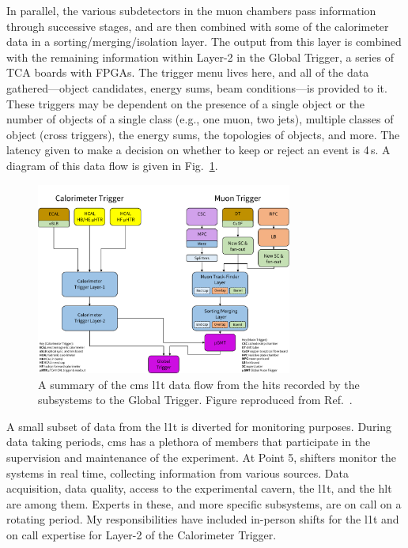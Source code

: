 In parallel, the various subdetectors in the muon chambers pass information through successive stages, and are then combined with some of the calorimeter data in a sorting/merging/isolation layer. The output from this layer is combined with the remaining information within Layer-2 in the Global Trigger, a series of \si{\micro}TCA boards with FPGAs. The trigger menu lives here, and all of the data gathered---object candidates, energy sums, beam conditions---is provided to it. These triggers may be dependent on the presence of a single object or the number of objects of a single class (e.g., one muon, two \glspl{jet}), multiple classes of object (cross triggers), the energy sums, the topologies of objects, and more. The latency given to make a decision on whether to keep or reject an event is 4\,\si{\micro}s. A diagram of this data flow is given in Fig.~\ref{fig:cms_l1t_data_flow}.

\begin{figure}[htbp]
    \centering
    \includegraphics[width=0.75\textwidth]{figures/CMS_L1T_data_flow_key_ordered.pdf}
    \caption[A summary of the CMS Level-1 Trigger data flow from the hits recorded by the subsystems to the Global Trigger]{A summary of the \acrshort{cms} \acrlong{l1t} data flow from the hits recorded by the subsystems to the Global Trigger. Figure reproduced from Ref.~.}
    \label{fig:cms_l1t_data_flow}
\end{figure}

A small subset of data from the \acrshort{l1t} is diverted for monitoring purposes. During data taking periods, \acrshort{cms} has a plethora of members that participate in the supervision and maintenance of the experiment. At Point 5, shifters monitor the systems in real time, collecting information from various sources. Data acquisition, data quality, access to the experimental cavern, the \acrshort{l1t}, and the \acrshort{hlt} are among them. Experts in these, and more specific subsystems, are on call on a rotating period. My responsibilities have included in-person shifts for the \acrlong{l1t} and on call expertise for Layer-2 of the Calorimeter Trigger.


